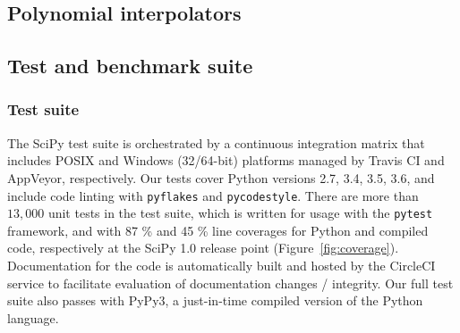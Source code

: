 \documentclass[fleqn,10pt]{wlscirep}
\begin{document}
\subsection*{Polynomial interpolators}



\subsection*{Test and benchmark suite}

\subsubsection*{Test suite}

The SciPy test suite is orchestrated by a continuous integration matrix that
includes POSIX and Windows (32/64-bit) platforms managed by Travis CI and
AppVeyor, respectively. Our tests cover Python versions 2.7, 3.4, 3.5, 3.6, and
include code linting with \texttt{pyflakes} and \texttt{pycodestyle}. There are more than $13,000$
unit tests in the test suite, which is written for usage with the \texttt{pytest}
framework, and with 87 \% and 45 \% line coverages for Python and compiled
code, respectively at the SciPy 1.0 release point (Figure~\ref{fig:coverage}). Documentation for the code is automatically built and hosted by
the CircleCI service to facilitate evaluation of documentation changes /
integrity.  Our full test suite also passes with PyPy3\cite{Bolz:2009:TMP:1565824.1565827}, a just-in-time compiled
version of the Python language.
\end{document}
